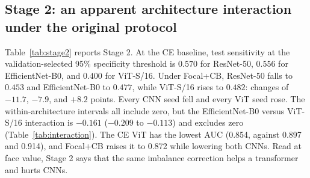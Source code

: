 \documentclass[11pt]{article}
\begin{document}
\subsection{Stage 2: an apparent architecture interaction under the original protocol}

Table~\ref{tab:stage2} reports Stage 2. At the CE baseline, test sensitivity at the validation-selected 95\% specificity threshold is $0.570$ for ResNet-50, $0.556$ for EfficientNet-B0, and $0.400$ for ViT-S/16. Under Focal+CB, ResNet-50 falls to $0.453$ and EfficientNet-B0 to $0.477$, while ViT-S/16 rises to $0.482$: changes of $-11.7$, $-7.9$, and $+8.2$ points. Every CNN seed fell and every ViT seed rose. The within-architecture intervals all include zero, but the EfficientNet-B0 versus ViT-S/16 interaction is $-0.161$ ($-0.209$ to $-0.113$) and excludes zero (Table~\ref{tab:interaction}). The CE ViT has the lowest AUC (0.854, against 0.897 and 0.914), and Focal+CB raises it to 0.872 while lowering both CNNs. Read at face value, Stage 2 says that the same imbalance correction helps a transformer and hurts CNNs.

\begin{table}[t]
\centering
\small
\caption{Stage 2 under the original protocol (shared learning rate $3\times10^{-4}$, checkpoint selected by validation balanced accuracy at the 0.5 threshold) at 224 pixels. Validation values are mean and standard deviation across three seeds. Test sensitivity is the mean with a 95\% t interval across three seeds at the validation-selected 95\% specificity threshold.}
\label{tab:stage2}
\end{table}
\end{document}
